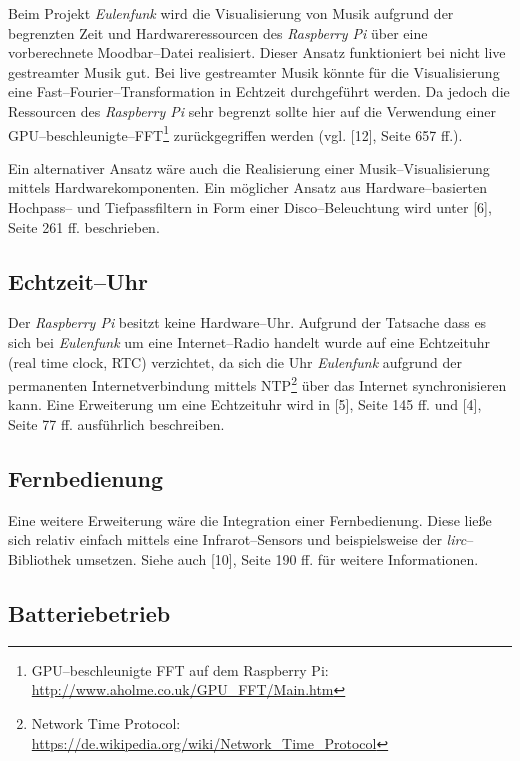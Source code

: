 \documentclass[11pt,ngerman,toc=listof,index=totoc]{scrreprt}
\begin{document}
Beim Projekt \emph{Eulenfunk} wird die Visualisierung von Musik aufgrund
der begrenzten Zeit und Hardwareressourcen des \emph{Raspberry Pi }über
eine vorberechnete Moodbar--Datei realisiert. Dieser Ansatz funktioniert
bei nicht live gestreamter Musik gut. Bei live gestreamter Musik könnte
für die Visualisierung eine Fast--Fourier--Transformation in Echtzeit
durchgeführt werden. Da jedoch die Ressourcen des \emph{Raspberry Pi}
sehr begrenzt sollte hier auf die Verwendung einer
GPU--beschleunigte--FFT\footnote{GPU--beschleunigte FFT auf dem
  Raspberry Pi: \url{http://www.aholme.co.uk/GPU_FFT/Main.htm}}
zurückgegriffen werden (vgl. {[}12{]}, Seite 657 ff.).

Ein alternativer Ansatz wäre auch die Realisierung einer
Musik--Visualisierung mittels Hardwarekomponenten. Ein möglicher Ansatz
aus Hardware--basierten Hochpass-- und Tiefpassfiltern in Form einer
Disco--Beleuchtung wird unter {[}6{]}, Seite 261 ff. beschrieben.

\subsection{Echtzeit--Uhr}\label{echtzeituhr}

Der \emph{Raspberry Pi} besitzt keine Hardware--Uhr. Aufgrund der
Tatsache dass es sich bei \emph{Eulenfunk} um eine Internet--Radio
handelt wurde auf eine Echtzeituhr (real time clock, RTC) verzichtet, da
sich die Uhr \emph{Eulenfunk} aufgrund der permanenten
Internetverbindung mittels NTP\footnote{Network Time Protocol:
  \url{https://de.wikipedia.org/wiki/Network_Time_Protocol}} über das
Internet synchronisieren kann. Eine Erweiterung um eine Echtzeituhr wird
in {[}5{]}, Seite 145 ff. und {[}4{]}, Seite 77 ff. ausführlich
beschreiben.

\subsection{Fernbedienung}\label{fernbedienung}

Eine weitere Erweiterung wäre die Integration einer Fernbedienung. Diese
ließe sich relativ einfach mittels eine Infrarot--Sensors und
beispielsweise der \emph{lirc}--Bibliothek umsetzen. Siehe auch
{[}10{]}, Seite 190 ff. für weitere Informationen.

\subsection{Batteriebetrieb}\label{batteriebetrieb}
\end{document}
